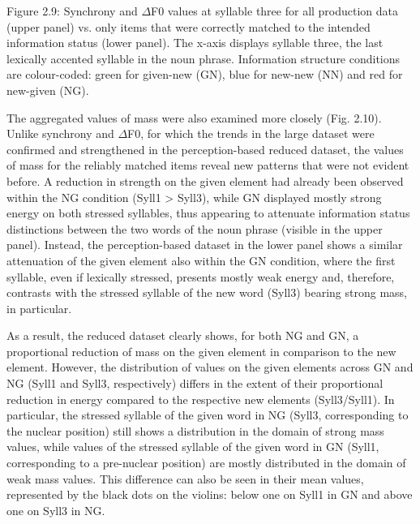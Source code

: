 \begin{stylecaption}
  [Warning: Image ignored] %
 
\end{stylecaption}

\begin{stylecaption}
Figure 2.9: Synchrony and ${\Delta}$F0 values at syllable three for all production data (upper panel) vs. only items that were correctly matched to the intended information status (lower panel). The x-axis displays syllable three, the last lexically accented syllable in the noun phrase. Information structure conditions are colour-coded: green for given-new (GN), blue for new-new (NN) and red for new-given (NG).
\end{stylecaption}

\begin{styleStandard}
The aggregated values of mass were also examined more closely (Fig. 2.10). Unlike synchrony and ${\Delta}$F0, for which the trends in the large dataset were confirmed and strengthened in the perception-based reduced dataset, the values of mass for the reliably matched items reveal new patterns that were not evident before. A reduction in strength on the given element had already been observed within the NG condition (Syll1 {\textgreater} Syll3), while GN displayed mostly strong energy on both stressed syllables, thus appearing to attenuate information status distinctions between the two words of the noun phrase (visible in the upper panel). Instead, the perception-based dataset in the lower panel shows a similar attenuation of the given element also within the GN condition, where the first syllable, even if lexically stressed, presents mostly weak energy and, therefore, contrasts with the stressed syllable of the new word (Syll3) bearing strong mass, in particular.
\end{styleStandard}

\begin{styleStandard}
As a result, the reduced dataset clearly shows, for both NG and GN, a proportional reduction of mass on the given element in comparison to the new element. However, the distribution of values on the given elements across GN and NG (Syll1 and Syll3, respectively) differs in the extent of their proportional reduction in energy compared to the respective new elements (Syll3/Syll1). In particular, the stressed syllable of the given word in NG (Syll3, corresponding to the nuclear position) still shows a distribution in the domain of strong mass values, while values of the stressed syllable of the given word in GN (Syll1, corresponding to a pre-nuclear position) are mostly distributed in the domain of weak mass values. This difference can also be seen in their mean values, represented by the black dots on the violins: below one on Syll1 in GN and above one on Syll3 in NG.
\end{styleStandard}


